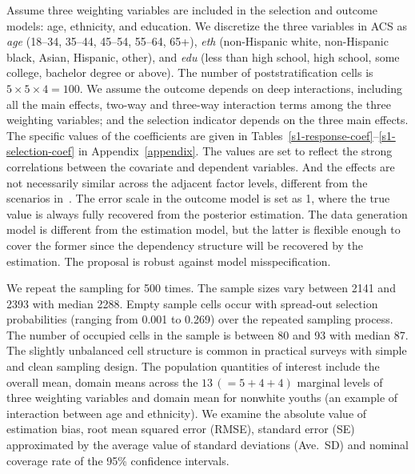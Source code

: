 \documentclass[11pt]{article}
\numberwithin{figure}{section}
\numberwithin{table}{section}
\numberwithin{equation}{section}
\begin{document}
Assume three weighting variables are included in the selection and outcome
models: age, ethnicity, and education. We discretize the three variables in ACS
as {\em age} (18--34, 35--44, 45--54, 55--64, 65+), {\em eth} (non-Hispanic
white, non-Hispanic black, Asian, Hispanic, other), and {\em edu} (less than
high school, high school, some college, bachelor degree or above). The number
of poststratification cells is $5\times 5 \times 4 = 100$. We assume the
outcome depends on deep interactions, including all the main effects, two-way
and three-way interaction terms among the three weighting variables; and the
selection indicator depends on the three main effects. The specific values of
the coefficients are given in
Tables~\ref{s1-response-coef}--\ref{s1-selection-coef} in
Appendix~\ref{appendix}. The values are set to reflect the strong correlations
between the covariate and dependent variables. And the effects are not
necessarily similar across the adjacent factor levels, different from the
scenarios in~\cite{volfovsky:hoff14}. The error scale in the outcome model is
set as 1, where the true value is always fully recovered from the posterior
estimation. The data generation model is different from the estimation model,
but the latter is flexible enough to cover the former since the dependency
structure will be recovered by the estimation. The proposal is robust against
model misspecification.

We repeat the sampling for 500 times. The sample sizes vary between 2141 and
2393 with median 2288. Empty sample cells occur with spread-out selection
probabilities (ranging from 0.001 to 0.269) over the repeated sampling process.
The number of occupied cells in the sample is between 80 and 93 with median 87.
The slightly unbalanced cell structure is common in practical surveys with
simple and clean sampling design. The population quantities of interest include
the overall mean, domain means across the $13\, (=5+4+4)$ marginal levels of
three weighting variables and domain mean for nonwhite youths (an example of
interaction between age and ethnicity). We examine the absolute value of
estimation bias, root mean squared error (RMSE), standard error (SE)
approximated by the average value of standard deviations (Ave.\ SD) and nominal
coverage rate of the 95\% confidence intervals.
\end{document}
